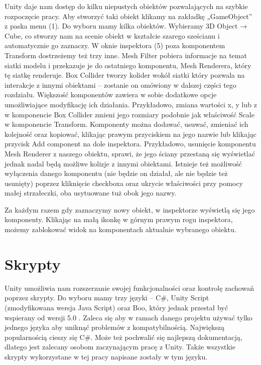 \documentclass[openright]{xmgr}
\begin{document}
Unity daje nam dostęp do kilku niepustych obiektów pozwalających na szybkie rozpoczęcie pracy. Aby stworzyć taki obiekt klikamy na zakładkę „GameObject” z paska menu (1). Do wyboru mamy kilka obiektów. Wybieramy 3D Object → Cube, co stworzy nam na scenie obiekt w kształcie szarego sześcianu i automatycznie go zaznaczy. W oknie inspektora (5) poza komponentem Transform dostrzeżemy też trzy inne. Mesh Filter pobiera informacje na temat siatki modelu i przekazuje je do ostatniego komponentu, Mesh Renderera, który tę siatkę renderuje. Box Collider tworzy kolider wokół siatki który pozwala na interakcje z innymi obiektami – zostanie on omówiony w dalszej części tego rozdziału. Większość komponentów zawiera w sobie dodatkowe opcje umożliwiające modyfikację ich działania. Przykładowo, zmiana wartości x, y  lub z w komponencie Box Collider zmieni jego rozmiary podobnie jak właściwość Scale w komponencie Transform. Komponenty można dodawać, usuwać, zmieniać ich kolejność oraz kopiować, klikając prawym przyciskiem na jego nazwie lub klikając przycisk Add component na dole inspektora. Przykładowo, usunięcie komponentu Mesh Renderer z naszego obiektu, sprawi, że jego ściany przestaną się wyświetlać jednak nadal będą możliwe kolizje z innymi obiektami.
Istnieje też możliwość wyłączenia danego komponentu (nie będzie on działał, ale nie będzie też usunięty) poprzez kliknięcie checkboxa  oraz ukrycie właściwości przy pomocy małej strzałeczki, oba usytuowane tuż obok jego nazwy.

Za każdym razem gdy zaznaczymy nowy obiekt, w inspektorze wyświetlą się jego komponenty. Klikając na małą ikonkę w górnym prawym rogu inspektora, możemy zablokować widok na komponentach aktualnie wybranego obiektu.

\section{Skrypty}

Unity umożliwia nam rozszerzanie swojej funkcjonalności oraz kontrolę zachowań poprzez skrypty. Do wyboru mamy trzy języki – C\#, Unity Script (zmodyfikowana wersja Java Script) oraz Boo, który jednak przestał być wspierany od wersji 5.0 . Zaleca się aby w ramach danego projektu używać tylko jednego języka aby uniknąć problemów z kompatybilnością.
Największą popularnością cieszy się C\#. Może też pochwalić się najlepszą dokumentacją, dlatego jest zalecany osobom zaczynającym pracę z Unity. Także wszystkie skrypty wykorzystane w tej pracy napisane zostały w tym języku.
\end{document}
